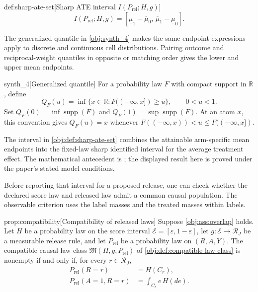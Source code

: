 \documentclass[11pt]{article}
\begin{document}
\begin{definitionv}{def:sharp-ate-set}[Sharp ATE interval $I(P_{\mathrm{rel}};H,g)$]
\[
I(P_{\mathrm{rel}};H,g)
=
[\underline\mu_1-\overline\mu_0,\,
 \overline\mu_1-\underline\mu_0].
\]
\end{definitionv}

The generalized quantile  in \cref{obj:synth_4} makes the same endpoint expressions apply to discrete and continuous cell distributions. Pairing outcome and reciprocal-weight quantiles in opposite or matching order gives the lower and upper mean endpoints.

\begin{definitionv}{synth_4}[Generalized quantile]
For a probability law \(F\) with compact support in \(\mathbb R\), define
\[
Q_F(u)=\inf\{x\in\mathbb R:F((-\infty,x])\ge u\},\qquad 0<u<1.
\]
Set \(Q_F(0)=\inf\operatorname{supp}(F)\) and \(Q_F(1)=\sup\operatorname{supp}(F)\). At an atom \(x\), this convention gives \(Q_F(u)=x\) whenever \(F((-\infty,x))<u\le F((-\infty,x])\).
\end{definitionv}

The interval  in \cref{obj:def:sharp-ate-set} combines the attainable arm-specific mean endpoints into the fixed-law sharp identified interval for the average treatment effect. The mathematical antecedent is \citet[Theorem 3.2 and eq. (3.1)]{FanShermanShum2014}; the displayed result here is proved under the paper's stated model conditions.

Before reporting that interval for a proposed release, one can check whether the declared score law and released law admit a common causal population. The observable criterion uses the label masses and the treated masses within labels.

\begin{theoremv}{prop:compatibility}[Compatibility of released laws]
Suppose \cref{obj:ass:overlap} holds. Let \(H\) be a probability law on the score interval \(\mathcal E=[\varepsilon,1-\varepsilon]\), let \(g:\mathcal E\to\mathcal R_J\) be a measurable release rule, and let \(P_{\mathrm{rel}}\) be a probability law on \((R,A,Y)\). The compatible causal-law class \(\mathfrak M(H,g,P_{\mathrm{rel}})\) of \cref{obj:def:compatible-law-class} is nonempty if and only if, for every \(r\in\mathcal R_J\),
\[
\begin{aligned}
P_{\mathrm{rel}}(R=r) &= H(C_r),\\
P_{\mathrm{rel}}(A=1,R=r) &= \int_{C_r} e\,H(de).
\end{aligned}
\]
\end{theoremv}
\end{document}
